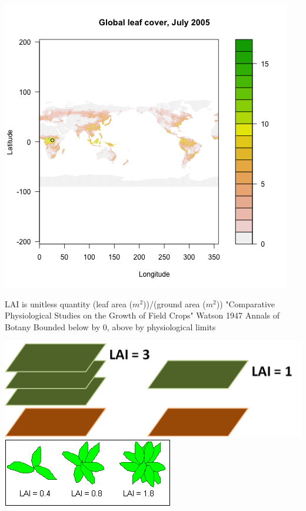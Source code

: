 \documentclass[11pt]{article}
\begin{document}
\includegraphics{../img/LAI_global_t0.png}

LAI is unitless quantity (leaf area ($m^2$))/(ground area ($m^2$))
"Comparative Physiological Studies on the Growth of Field Crops" Watson 1947 Annals of Botany
Bounded below by 0, above by physiological limits

\includegraphics{../img/lai.png}\\
\includegraphics{../img/lai2.png}
\end{document}
